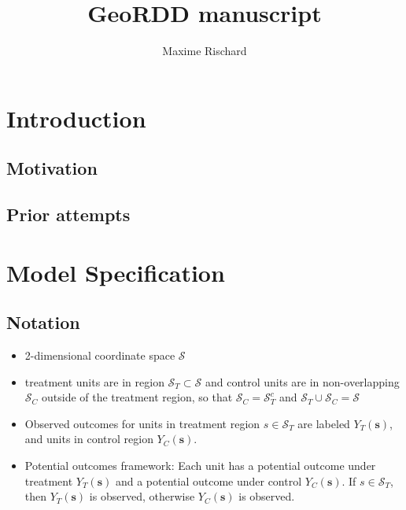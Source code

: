 \documentclass[letter]{article}
\title{GeoRDD manuscript}
\author{Maxime Rischard}
\providecommand{\tightlist}{%
      \setlength{\itemsep}{0pt}\setlength{\parskip}{0pt}}
\newcommand{\scrS}{\mathscr{S}}
\newcommand{\svec}{\mathbf{s}}
\providecommand{\tightlist}{%
  	  \setlength{\itemsep}{0pt}\setlength{\parskip}{0pt}}
\begin{document}
    
    
    
    \maketitle
    
    
	\tableofcontents


    





    	\section{Introduction}\label{introduction}

\subsection{Motivation}\label{motivation}

\subsection{Prior attempts}\label{prior-attempts}
    


    	\section{Model Specification}\label{model-specification}

\subsection{Notation}\label{notation}

\begin{itemize}
\tightlist
\item
  2-dimensional coordinate space \(\scrS\)
\item
  treatment units are in region \(\scrS_T \subset \scrS\) and control
  units are in non-overlapping \(\scrS_C\) outside of the treatment
  region, so that \(\scrS_C = \scrS_T^c\) and
  \(\scrS_T \cup \scrS_C = \scrS\)
\item
  Observed outcomes for units in treatment region \(s \in \scrS_T\) are
  labeled \(Y_T(\svec)\), and units in control region \(Y_C(\svec)\).
\item
  Potential outcomes framework: Each unit has a potential outcome under
  treatment \(Y_T(\svec)\) and a potential outcome under control
  \(Y_C(\svec)\). If \(s \in \scrS_T\), then \(Y_T(\svec)\) is observed,
  otherwise \(Y_C(\svec)\) is observed.
\end{itemize}
\end{document}
